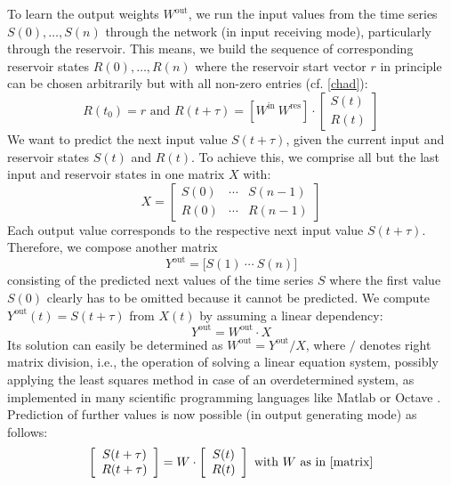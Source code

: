 \documentclass[twoside,11pt]{article}
\theoremstyle{definition}
\begin{document}
To learn the output weights $W^\mathrm{out}$, we run the input values from the
time series $S(0),\dots,S(n)$ through the network (in input receiving mode),
particularly through the reservoir. This means, we build the sequence of
corresponding reservoir states $R(0),\dots,R(n)$ where the reservoir start
vector $r$ in principle can be chosen arbitrarily but with all non-zero
entries (cf. \cref{chad}):
\begin{equation}\label{Res}
	R(t_0) = r \text{~and~} R(t+\tau) =
	\left[ W^\mathrm{in} ~ W^\mathrm{res} \right] \cdot
	\left[ \begin{array}{c} S(t) \\ R(t) \end{array} \right]
\end{equation}
We want to predict the next input value $S(t+\tau)$, given the current input and
reservoir states $S(t)$ and $R(t)$. To achieve this, we comprise
all but the last input and reservoir states in one matrix $X$ with:
\begin{equation}\label{Xin}
    X = \left[ \begin{array}{ccc}
	S(0) & \cdots & S(n-1)\\
	R(0) & \cdots & R(n-1)
	\end{array} \right]
\end{equation}
Each output value corresponds to the respective next input value $S(t+\tau)$.
Therefore, we compose another matrix
\begin{equation}\label{Yout}
	Y^\mathrm{out} = \big[ S(1)\ \cdots\ S(n) \big]
\end{equation}
consisting of the predicted next values of the time series $S$
where the first value $S(0)$ clearly has to be omitted because it cannot be
predicted. We compute $Y^\mathrm{out}(t) = S(t+\tau)$ from $X(t)$ by assuming a
linear dependency:
\begin{equation}\label{linear}
	Y^\mathrm{out} = W^\mathrm{out} \cdot X
\end{equation}
Its solution can easily be determined as $W^\mathrm{out} = Y^\mathrm{out}/X$,
where $/$ denotes right matrix division, i.e., the operation of solving a linear
equation system, possibly applying the least squares method in case of an
overdetermined system, as implemented in many scientific programming languages
like Matlab \citep{HH17} or Octave \citep{EB+17}. Prediction of further values
is now possible (in output generating mode) as follows:
\begin{equation}\label{predict}
	\left[ \begin{array}{c} S(t+\tau) \\ R(t+\tau) \end{array} \right]
	= W \cdot \left[ \begin{array}{c} S(t) \\ R(t) \end{array} \right]
	\text{~with~} W \text{~as in \cref{matrix}}
\end{equation}
\end{document}
